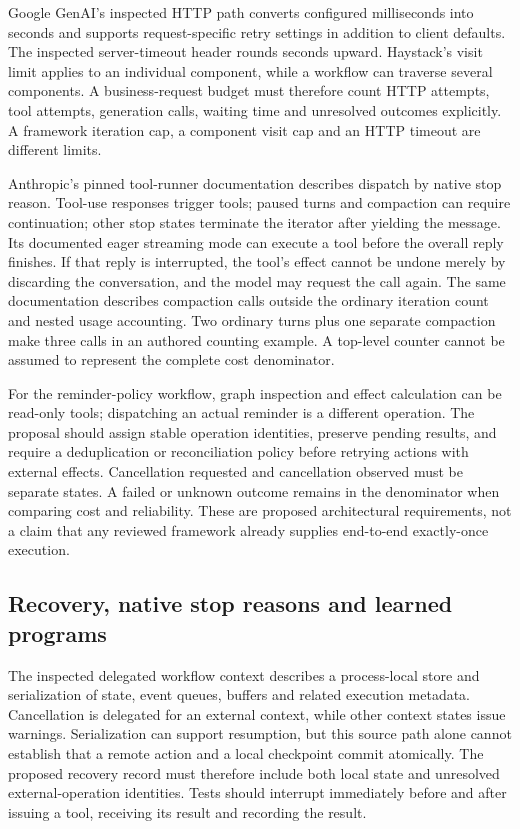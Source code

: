 Google GenAI's inspected HTTP path converts configured milliseconds into seconds and supports
request-specific retry settings in addition to client defaults. The inspected server-timeout header
rounds seconds upward. Haystack's visit limit applies to an individual component, while a workflow
can traverse several components. A business-request budget must therefore count HTTP attempts,
tool attempts, generation calls, waiting time and unresolved outcomes explicitly. A framework
iteration cap, a component visit cap and an HTTP timeout are different limits.
\citep{exec28_dl_google,exec28_dl_haystack}

Anthropic's pinned tool-runner documentation describes dispatch by native stop reason. Tool-use
responses trigger tools; paused turns and compaction can require continuation; other stop states
terminate the iterator after yielding the message. Its documented eager streaming mode can execute
a tool before the overall reply finishes. If that reply is interrupted, the tool's effect cannot be
undone merely by discarding the conversation, and the model may request the call again. The same
documentation describes compaction calls outside the ordinary iteration count and nested usage
accounting. Two ordinary turns plus one separate compaction make three calls in an authored counting
example. A top-level counter cannot be assumed to represent the complete cost denominator.
\citep{exec28_dl_anthropic,exec28_dl_reference}

For the reminder-policy workflow, graph inspection and effect calculation can be read-only tools;
dispatching an actual reminder is a different operation. The proposal should assign stable operation
identities, preserve pending results, and require a deduplication or reconciliation policy before
retrying actions with external effects. Cancellation requested and cancellation observed must be
separate states. A failed or unknown outcome remains in the denominator when comparing cost and
reliability. These are proposed architectural requirements, not a claim that any reviewed framework
already supplies end-to-end exactly-once execution.

\subsection{Recovery, native stop reasons and learned programs}
The inspected delegated workflow context describes a process-local store and serialization of
state, event queues, buffers and related execution metadata. Cancellation is delegated for an
external context, while other context states issue warnings. Serialization can support resumption,
but this source path alone cannot establish that a remote action and a local checkpoint commit
atomically. The proposed recovery record must therefore include both local state and unresolved
external-operation identities. Tests should interrupt immediately before and after issuing a tool,
receiving its result and recording the result.~\citep{exec28_dl_workflows}

